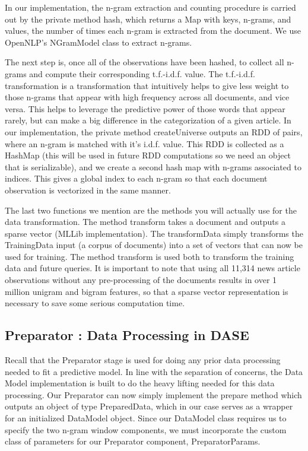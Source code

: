 \documentclass[a4paper,12pt]{article}
\newcommand{\3}{\left}
\newcommand{\4}{\right}
\renewcommand{\-}[1]{{}^{-#1}}
\begin{document}
In our implementation, the n-gram extraction and counting procedure is carried out by the private method hash, which returns a Map with keys, n-grams, and values, the number of times each n-gram is extracted from the document. We use OpenNLP's NGramModel class to extract n-grams.

The next step is, once all of the observations have been hashed, to collect all n-grams and compute their corresponding t.f.-i.d.f. value. The t.f.-i.d.f. transformation is a transformation that intuitively helps to give less weight to those n-grams that appear with high frequency across all documents, and vice versa. This helps to leverage the predictive power of those words that appear rarely, but can make a big difference in the categorization of a given article. In our implementation, the private method createUniverse outputs an RDD of pairs, where an n-gram is matched with it's i.d.f. value. This RDD is collected as a HashMap (this will be used in future RDD computations so we need an object that is serializable), and we create a second hash map with n-grams associated to indices. This gives a global index to each n-gram so that each document observation is vectorized in the same manner. 

The last two functions we mention are the methods you will actually use for the data transformation. The method transform takes a document and outputs a sparse vector (MLLib implementation). The transformData simply transforms the TrainingData input (a corpus of documents) into a set of vectors that can now be used for training. The method transform is used both to transform the training data and future queries. It is important to note that using all 11,314 news article observations without any pre-processing of the documents results in over 1 million unigram and bigram features, so that a sparse vector representation is necessary to save some serious computation time.


\subsection*{Preparator : Data Processing in DASE}

Recall that the Preparator stage is used for doing any prior data processing needed to fit a predictive model. In line with the separation of concerns, the Data Model implementation is built to do the heavy lifting needed for this data processing. Our Preparator can now simply implement the prepare method which outputs an object of type PreparedData, which in our case serves as a wrapper for an initialized DataModel object. Since our DataModel class requires us to specify the two n-gram window components, we must incorporate the custom class of parameters for our Preparator component, PreparatorParams. 
\end{document}
